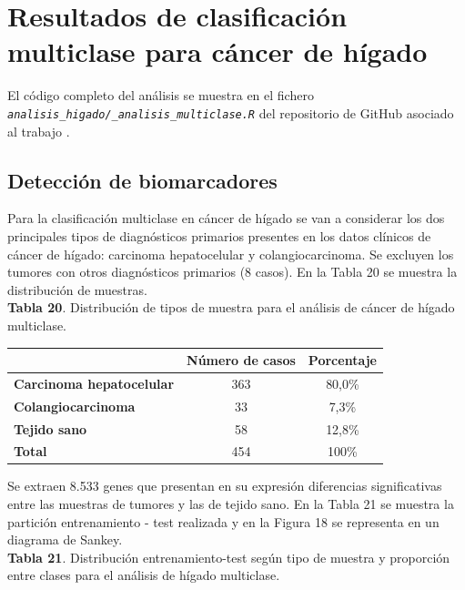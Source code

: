 \section{Resultados de clasificación multiclase para cáncer de hígado}

El código completo del análisis se muestra en el fichero \textit{\texttt{analisis\_higado/\_analisis\_multiclase.R}} del repositorio de GitHub asociado al trabajo \cite{Redondo-Sanchez2020}.

\subsection{Detección de biomarcadores}

Para la clasificación multiclase en cáncer de hígado se van a considerar los dos principales tipos de diagnósticos primarios presentes en los datos clínicos de cáncer de hígado: carcinoma hepatocelular y colangiocarcinoma. Se excluyen los tumores con otros diagnósticos primarios (8 casos). En la Tabla 20 se muestra la distribución de muestras.\\

\textbf{Tabla 20}. Distribución de tipos de muestra para el análisis de cáncer de hígado multiclase.

\begin{table}[H]
	\centering
	\begin{tabular}{lcc}
		\cline{2-3}
		& \textbf{Número de casos} & \textbf{Porcentaje} \\ \hline
		\textbf{Carcinoma hepatocelular}     & 363        & 80,0\%              \\
		\textbf{Colangiocarcinoma}     & 33        & 7,3\%              \\
		\textbf{Tejido sano} & 58         & 12,8\%              \\ \hline
		\textbf{Total}       & 454        & 100\%               \\ \hline
	\end{tabular}
\end{table}

Se extraen 8.533 genes que presentan en su expresión diferencias significativas entre las muestras de tumores y las de tejido sano. En la Tabla 21 se muestra la partición entrenamiento - test realizada y en la Figura 18 se representa en un diagrama de Sankey.\\

\textbf{Tabla 21}. Distribución entrenamiento-test según tipo de muestra y proporción entre clases para el análisis de hígado multiclase.\\


